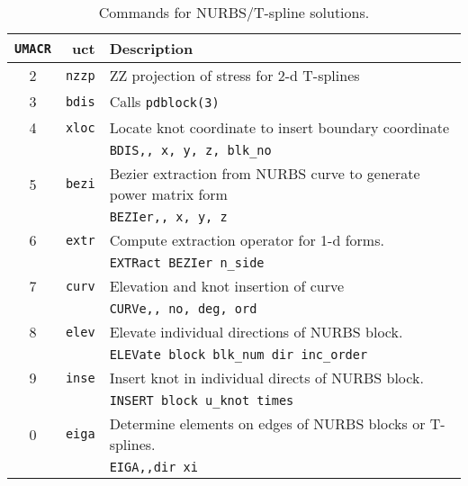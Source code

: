 
\begin{table}[h]
\begin{center}
\begin{tabular}{| c | r | p{11cm}|} \hline
\texttt{UMACR} & uct & Description \\ \hline
 2 & \texttt{nzzp} & ZZ projection of stress for 2-d T-splines \\
 3 & \texttt{bdis} & Calls  \texttt{pdblock(3)} \\
 4 & \texttt{xloc} & Locate knot coordinate to insert boundary coordinate \\
& & \texttt{BDIS,, x, y, z, blk\_no} \\
 5 & \texttt{bezi} & Bezier extraction from NURBS curve to generate power matrix form\\
& & \texttt{BEZIer,, x, y, z} \\
 6 & \texttt{extr} & Compute extraction operator for 1-d forms. \\
& & \texttt{EXTRact BEZIer n\_side} \\
 7 & \texttt{curv} & Elevation and knot insertion of curve \\
& & \texttt{CURVe,, no, deg, ord }\\
 8 & \texttt{elev} & Elevate individual directions of NURBS block. \\
& & \texttt{ELEVate block blk\_num dir inc\_order} \\
 9 & \texttt{inse} & Insert knot in individual directs of NURBS block. \\
& & \texttt{INSERT block u\_knot times} \\
 0 & \texttt{eiga} & Determine elements on edges of NURBS blocks or T-splines.\\
& & \texttt{EIGA,,dir xi} \\ \hline
\end{tabular}
\caption{Commands for NURBS/T-spline solutions. \label{tab1iga} }
\end{center}
\end{table}

